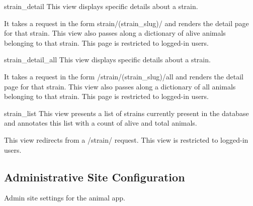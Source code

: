 \documentclass[letterpaper,10pt,english]{sphinxmanual}
\begin{document}
\hypertarget{animal.views.strain\_detail}{}\begin{memberdesc}{strain\_detail}
This view displays specific details about a strain.

It takes a request in the form strain/(strain\_slug)/ and renders the detail page for that strain.
This view also passes along a dictionary of alive animals belonging to that strain.
This page is restricted to logged-in users.
\end{memberdesc}

\hypertarget{animal.views.strain\_detail\_all}{}\begin{memberdesc}{strain\_detail\_all}
This view displays specific details about a strain.

It takes a request in the form /strain/(strain\_slug)/all and renders the detail page for that strain.
This view also passes along a dictionary of all animals belonging to that strain.
This page is restricted to logged-in users.
\end{memberdesc}

\hypertarget{animal.views.strain\_list}{}\begin{memberdesc}{strain\_list}
This view presents a list of strains currently present in the database and annotates this list with a count of alive and total animals.

This view redirects from a /strain/ request.
This view is restricted to logged-in users.
\end{memberdesc}
\hypertarget{module-animal.urls}{}
\modulesynopsis{}

\subsection{Administrative Site Configuration}
\hypertarget{module-animal.admin}{}
\modulesynopsis{}
Admin site settings for the animal app.
\end{document}
